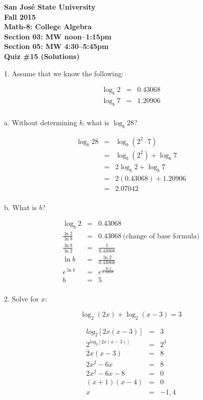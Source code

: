 \documentclass[letterpaper, 12pt]{article}
\begin{document}
\begin{center}
\bfseries
San Jos\'{e} State University \\
Fall 2015 \\
Math-8: College Algebra \\
Section 03: MW noon--1:15pm \\
Section 05: MW 4:30--5:45pm \\
\bigskip
Quiz \#15 (Solutions)
\end{center}

\bigskip

1. Assume that we know the following:

\begin{eqnarray*}
\log_{b}2 &=& 0.43068 \\
\log_{b}7 &=& 1.20906 \\
\end{eqnarray*}

a. Without determining $b$, what is $\log_{b}28$?

\begin{eqnarray*}
\log_{b}28 &=& \log_{b}(2^2\cdot7) \\
    &=& \log_{b}(2^2)+\log_{b}7 \\
    &=& 2\log_{b}2+\log_{b}7 \\
    &=& 2(0.43068)+1.20906 \\
    &=& 2.07042 \\
\end{eqnarray*}

b. What is $b$?

\begin{eqnarray*}
\log_{b}2 &=& 0.43068 \\
\frac{\ln 2}{\ln b} &=& 0.43068\ \mbox{(change of base formula)} \\
\frac{\ln b}{\ln 2} &=& \frac{1}{0.43068} \\
\ln b &=& \frac{\ln 2}{0.43068} \\
e^{\ln b} &=& e^{\frac{\ln 2}{0.43068}} \\
b &=& 5 \\
\end{eqnarray*}

2. Solve for $x$:

\[\log_2(2x)+\log_2(x-3)=3\]

\begin{eqnarray*}
log_2[2x(x-3)] &=& 3 \\
2^{log_2[2x(x-3)]} &=& 2^3 \\
2x(x-3) &=& 8 \\
2x^2-6x &=& 8 \\
2x^2-6x-8 &=& 0 \\
(x+1)(x-4) &=& 0 \\
x &=& -1,4 \\
\end{eqnarray*}
\end{document}
